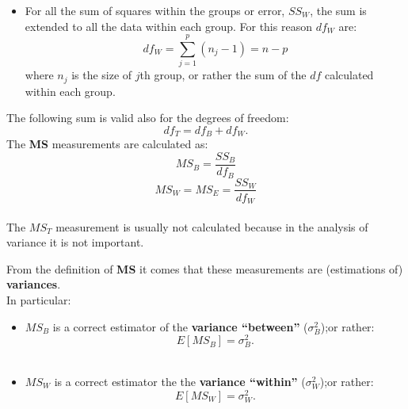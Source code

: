 \begin{frame}
  \vspace*{.5cm}
  \begin{itemize}
    \item For all the sum of squares within the groups or error, {\boldmath$SS_W$}, the sum is extended to all the data within each group. For this reason {\boldmath$df_W$} are:
      $$ df_W = \sum_{j=1}^p{(n_j-1)} = n-p $$
      where {\boldmath $ n_j $} is the size of $ j $th group, or rather the sum of the $ df $ calculated within each group.
  \end{itemize}
\end{frame}

\begin{frame}
  \vspace*{.25cm}
  The following sum is valid also for the degrees of freedom:
  $$ df_T = df_B + df_W \mbox{.} $$
  The \textbf{MS} measurements are calculated as:
  $$ MS_B = \frac{SS_B}{df_B} $$
  $$ MS_W = MS_E = \frac{SS_W}{df_W} $$\\
  \vspace*{.6cm}
  The {\boldmath$MS_T$} measurement is usually not calculated because in the analysis of variance it is not important.
\end{frame}

\begin{frame}
  \vspace*{.25cm}
  From the definition of \textbf{MS} it comes that these measurements are (estimations of) \textbf{variances}.\\
  \vspace*{.5cm}
  In particular:
  \begin{itemize}
    \item  {\boldmath$MS_B$} is a correct estimator of the \textbf{variance ``between''} ($\sigma^2_B$);\newline or rather:
      $$ E \left[ MS_B \right] = \sigma^2_B \mbox{.} $$\\
    \vspace*{.25cm}
    \item {\boldmath$MS_W$} is a correct estimator the the \textbf{variance ``within''} ($\sigma^2_W$);\newline or rather:
      $$ E \left[ MS_W \right] = \sigma^2_W \mbox{.} $$
  \end{itemize}
\end{frame}


